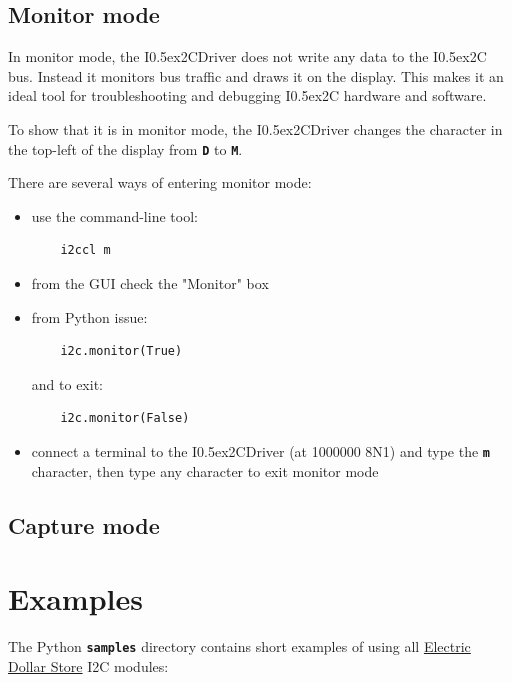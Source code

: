 \documentclass{article}
\newcommand{\two}{\raise0.5ex\hbox{\footnotesize{2}}}
\newcommand{\iic}{I\two{}C}
\newcommand{\iicdriver}{I\two{}CDriver}
\newcommand{\mach}[1]{\texttt{\textbf{#1}}}
\begin{document}
\subsection{Monitor mode}

In monitor mode, the \iicdriver{} does not write any data to the \iic{} bus.
Instead it monitors bus traffic and draws it on the display.
This makes it an ideal tool for troubleshooting and debugging \iic{} hardware and software.

To show that it is in monitor mode, the \iicdriver{} changes the character in the top-left of the display from \mach{D} to \mach{M}.

There are several ways of entering monitor mode:

\begin{itemize}
\item use the command-line tool:

\begin{lstlisting}
    i2ccl m
\end{lstlisting}

\item from the GUI check the "Monitor" box
\item from Python issue:

\begin{lstlisting}
    i2c.monitor(True)
\end{lstlisting}
  
and to exit:

\begin{lstlisting}
    i2c.monitor(False)
\end{lstlisting}

\item connect a terminal to the \iicdriver{} (at 1000000 8N1) and type the \mach{m} character, then type any character to exit monitor mode
\end{itemize}

\subsection{Capture mode}


\section{Examples}

The Python \mach{samples} directory contains short examples of using all
\href{https://electricdollarstore.com}{Electric Dollar Store} I2C modules:
\end{document}
